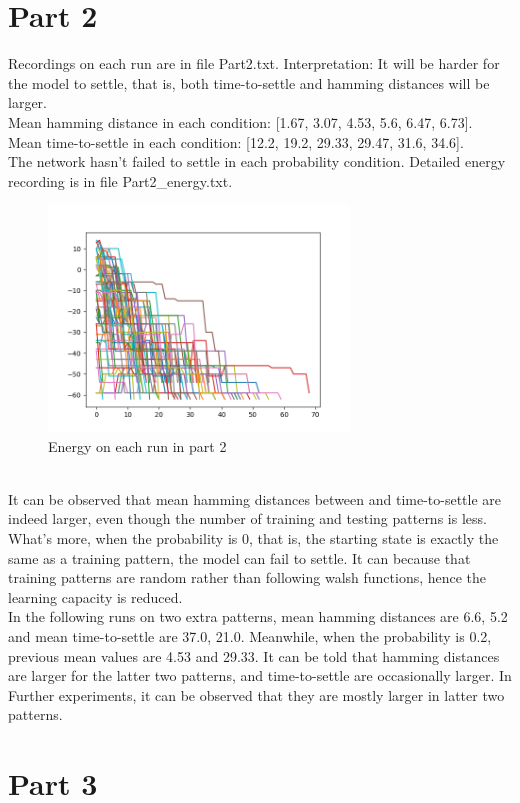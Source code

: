 \documentclass{article}
\begin{document}
\section*{Part 2}
Recordings on each run are in file Part2.txt. Interpretation: It will be harder for the model to settle, that is, both time-to-settle and hamming distances will be larger.\\
Mean hamming distance in each condition: [1.67, 3.07, 4.53, 5.6, 6.47, 6.73].\\
Mean time-to-settle in each condition: [12.2, 19.2, 29.33, 29.47, 31.6, 34.6].\\
The network hasn't failed to settle in each probability condition. Detailed energy recording is in file Part2\_energy.txt.\\
\begin{figure}[h]
    \centering
    \includegraphics[width=8cm]{Part2energy}
    \caption{Energy on each run in part 2}
\end{figure}\\
It can be observed that mean hamming distances between and time-to-settle are indeed larger, even though the number of training and testing patterns is less. What's more, when the probability is 0, that is, the starting state is exactly the same as a training pattern, the model can fail to settle. It can because that training patterns are random rather than following walsh functions, hence the learning capacity is reduced.\\
In the following runs on two extra patterns, mean hamming distances are 6.6, 5.2 and mean time-to-settle are 37.0, 21.0. Meanwhile, when the probability is 0.2, previous mean values are 4.53 and 29.33. It can be told that hamming distances are larger for the latter two patterns, and time-to-settle are occasionally larger. In Further experiments, it can be observed that they are mostly larger in latter two patterns.
\newpage

\section*{Part 3}
\end{document}
